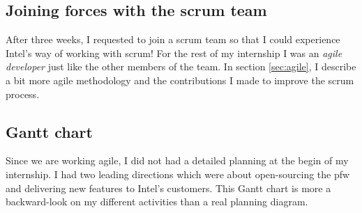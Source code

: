 \subsection{Joining forces with the scrum team}
After three weeks, I requested to join a \gls{scrum} team so that I could experience
Intel's way of working with \gls{scrum}!
For the rest of my internship I was an \emph{agile developer} just like the other members of the team.
In section \ref{sec:agile}, I describe a bit more agile methodology and the contributions I made to improve
the \gls{scrum} process.

\subsection{Gantt chart}
Since we are working agile, I did not had a detailed planning at the begin of my internship.
I had two leading directions which were about open-sourcing the \gls{pfw} and delivering new features
to Intel's customers.
This Gantt chart is more a backward-look on my different activities than a real planning
diagram.





